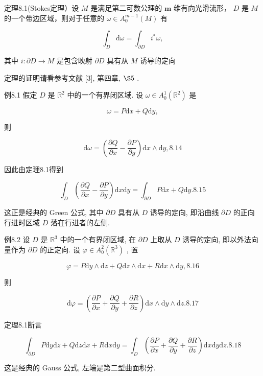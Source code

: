 定理8.1(Stokes定理）设  $M$  是满足第二可数公理的  $\pmb{m}$  维有向光滑流形，  $D$  是  $M$  的一个带边区域，则对于任意的  $\omega \in A_0^{m - 1}(M)$  有

$$
\int_ {D} \mathrm {d} \omega = \int_ {\partial D} i ^ {*} \omega , %
$$

其中  $i:\partial D\to M$  是包含映射  $\partial D$  具有从  $M$  诱导的定向

定理的证明请看参考文献 [3], 第四章,  $\S 5$ .

例8.1 假定  $D$  是  $\mathbb{R}^2$  中的一个有界闭区域. 设  $\omega \in A_0^1 (\mathbb{R}^2)$  是

$$
\omega = P \mathrm {d} x + Q \mathrm {d} y, %
$$

则

$$
\mathrm {d} \omega = \left(\frac {\partial Q}{\partial x} - \frac {\partial P}{\partial y}\right) \mathrm {d} x \wedge \mathrm {d} y,  {8.14}
$$

因此由定理8.1得到

$$
\int_ {D} \left(\frac {\partial Q}{\partial x} - \frac {\partial P}{\partial y}\right) \mathrm {d} x \mathrm {d} y = \int_ {\partial D} P \mathrm {d} x + Q \mathrm {d} y.  {8.15}
$$

这正是经典的 Green 公式, 其中  $\partial D$  具有从  $D$  诱导的定向, 即沿曲线  $\partial D$  的正向行进时区域  $D$  落在行进者的左侧.

例8.2 设  $D$  是  $\mathbb{R}^3$  中的一个有界闭区域, 在  $\partial D$  上取从  $D$  诱导的定向, 即以外法向量作为  $\partial D$  的正定向. 设  $\varphi \in A_0^2(\mathbb{R}^3)$ , 置

$$
\varphi = P \mathrm {d} y \wedge \mathrm {d} z + Q \mathrm {d} z \wedge \mathrm {d} x + R \mathrm {d} x \wedge \mathrm {d} y,  {8.16}
$$

则

$$
\mathrm {d} \varphi = \left(\frac {\partial P}{\partial x} + \frac {\partial Q}{\partial y} + \frac {\partial R}{\partial z}\right) \mathrm {d} x \wedge \mathrm {d} y \wedge \mathrm {d} z.  {8.17}
$$

定理8.1断言

$$
\int_ {\partial D} P \mathrm {d} y \mathrm {d} z + Q \mathrm {d} z \mathrm {d} x + R \mathrm {d} x \mathrm {d} y = \int_ {D} \left(\frac {\partial P}{\partial x} + \frac {\partial Q}{\partial y} + \frac {\partial R}{\partial z}\right) \mathrm {d} x \mathrm {d} y \mathrm {d} z.  {8.18}
$$

这是经典的 Gauss 公式, 左端是第二型曲面积分.

